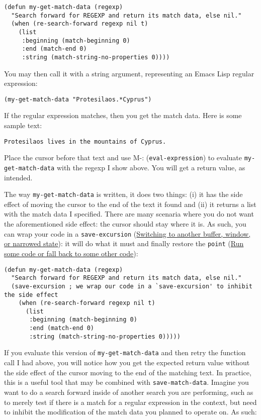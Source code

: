 \documentclass[11pt]{ctexart}
\begin{document}
\begin{verbatim}
(defun my-get-match-data (regexp)
  "Search forward for REGEXP and return its match data, else nil."
  (when (re-search-forward regexp nil t)
    (list
     :beginning (match-beginning 0)
     :end (match-end 0)
     :string (match-string-no-properties 0))))
\end{verbatim}

You may then call it with a string argument, representing an Emacs Lisp regular expression:

\begin{verbatim}
(my-get-match-data "Protesilaos.*Cyprus")
\end{verbatim}

If the regular expression matches, then you get the match data. Here is some sample text:

\begin{verbatim}
Protesilaos lives in the mountains of Cyprus.
\end{verbatim}

Place the cursor before that text and use M-: (\texttt{eval-expression}) to evaluate \texttt{my-get-match-data} with the regexp I show above. You will get a return value, as intended.

The way \texttt{my-get-match-data} is written, it does two things: (i) it has the side effect of moving the cursor to the end of the text it found and (ii) it returns a list with the match data I specified. There are many scenaria where you do not want the aforementioned side effect: the cursor should stay where it is. As such, you can wrap your code in a \texttt{save-excursion} (\hyperref[sec:org518036f]{Switching to another buffer, window, or narrowed state}): it will do what it must and finally restore the \texttt{point} (\hyperref[sec:orgd0c57f0]{Run some code or fall back to some other code}):

\begin{verbatim}
(defun my-get-match-data (regexp)
  "Search forward for REGEXP and return its match data, else nil."
  (save-excursion ; we wrap our code in a `save-excursion' to inhibit the side effect
    (when (re-search-forward regexp nil t)
      (list
       :beginning (match-beginning 0)
       :end (match-end 0)
       :string (match-string-no-properties 0)))))
\end{verbatim}

If you evaluate this version of \texttt{my-get-match-data} and then retry the function call I had above, you will notice how you get the expected return value without the side effect of the cursor moving to the end of the matching text. In practice, this is a useful tool that may be combined with \texttt{save-match-data}. Imagine you want to do a search forward inside of another search you are performing, such as to merely test if there is a match for a regular expression in the context, but need to inhibit the modification of the match data you planned to operate on. As such:
\end{document}
